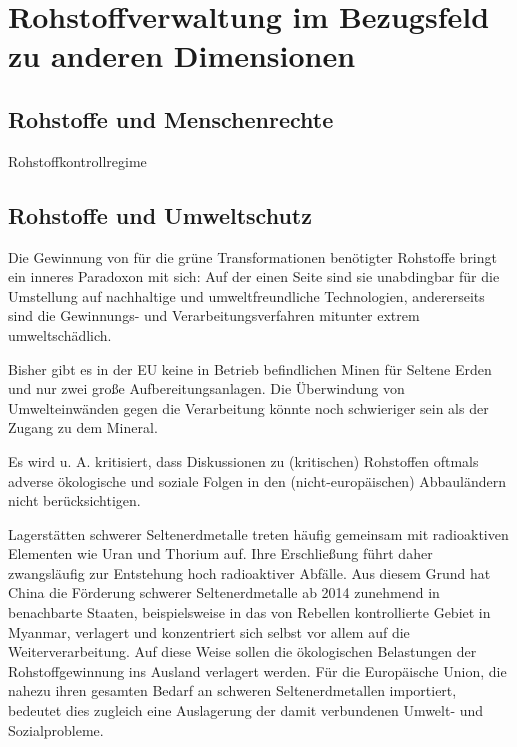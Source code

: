 \documentclass[12pt,a4paper,oneside]{book} %
\begin{document}
	
\chapter{Rohstoffverwaltung im Bezugsfeld zu anderen Dimensionen}


\section{Rohstoffe und Menschenrechte}

Rohstoffkontrollregime

\section{Rohstoffe und Umweltschutz}

Die Gewinnung von für die grüne Transformationen benötigter Rohstoffe bringt ein inneres Paradoxon mit sich: Auf der einen Seite sind sie unabdingbar für die Umstellung auf nachhaltige und umweltfreundliche Technologien, andererseits sind die Gewinnungs- und Verarbeitungsverfahren mitunter extrem umweltschädlich.\autocite{https://www.actu-environnement.com/ae/news/interview-christian-hocquard-terres-rares-applications-environnementales-impact-chine-10352.php4}

Bisher gibt es in der EU keine in Betrieb befindlichen Minen für Seltene Erden und nur zwei große Aufbereitungsanlagen. Die Überwindung von Umwelteinwänden gegen die Verarbeitung könnte noch schwieriger sein als der Zugang zu dem Mineral. 

Es wird u. A. kritisiert, dass Diskussionen zu (kritischen) Rohstoffen oftmals adverse ökologische und soziale Folgen in den (nicht-europäischen) Abbauländern nicht berücksichtigen.\autocite[15]{Kueblboeck_2023}

Lagerstätten schwerer Seltenerdmetalle treten häufig gemeinsam mit radioaktiven Elementen wie Uran und Thorium auf. Ihre Erschließung führt daher zwangsläufig zur Entstehung hoch radioaktiver Abfälle. Aus diesem Grund hat China die Förderung schwerer Seltenerdmetalle ab 2014 zunehmend in benachbarte Staaten, beispielsweise in das von Rebellen kontrollierte Gebiet in Myanmar, verlagert und konzentriert sich selbst vor allem auf die Weiterverarbeitung. Auf diese Weise sollen die ökologischen Belastungen der Rohstoffgewinnung ins Ausland verlagert werden. Für die Europäische Union, die nahezu ihren gesamten Bedarf an schweren Seltenerdmetallen importiert, bedeutet dies zugleich eine Auslagerung der damit verbundenen Umwelt- und Sozialprobleme.
\end{document}
